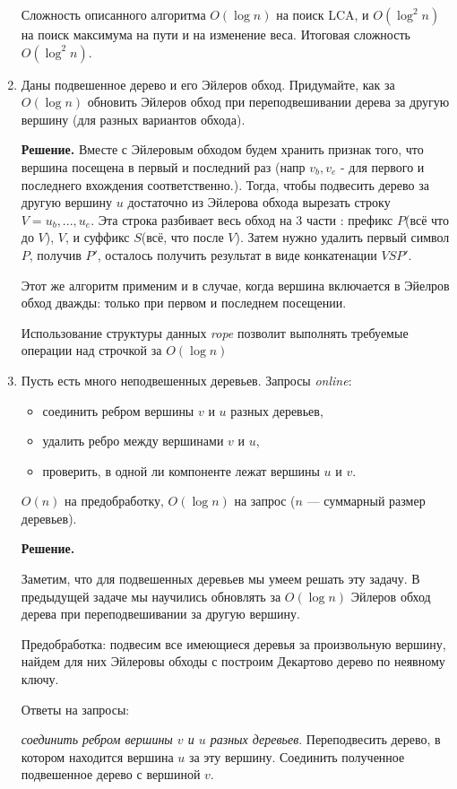 \begin{enumerate}
	Сложность описанного алгоритма $O(\log n)$ на поиск LCA, и $O(\log^2 
	n)$ на поиск максимума на пути и на изменение веса. Итоговая сложность 
	$O(\log^2 n)$.
	\item Даны подвешенное дерево и его Эйлеров обход. Придумайте, как за $O(\log n)$ обновить 
	Эйлеров	обход при переподвешивании дерева за другую вершину (для разных вариантов обхода).
	
	\textbf{Решение.} Вместе с Эйлеровым обходом будем хранить признак того, что вершина 
	посещена в первый и последний раз (напр $v_b, v_e$ - для первого и последнего вхождения 
	соответственно.). Тогда, чтобы подвесить дерево за другую вершину $u$ достаточно из 
	Эйлерова обхода вырезать строку  $V = u_b,..., u_e$. Эта строка разбивает весь обход на 3 
	части : префикс $P$(всё что до $V$), $V$, и суффикс $S$(всё, что после $V$). Затем нужно 
	удалить первый символ $P$, получив $P'$, осталось получить результат в виде конкатенации 
	$VSP'$.
	
	Этот же алгоритм применим и в случае, когда вершина включается в Эйелров обход дважды: только при первом и последнем посещении.
	
	Использование структуры данных \textit{rope} позволит выполнять требуемые операции над строчкой за $O(\log n)$
	
	\item Пусть есть много неподвешенных деревьев. Запросы \textit{online}:
	\begin{itemize}
		\item соединить ребром вершины $v$ и $u$ разных деревьев,
		\item удалить ребро между вершинами $v$ и $u$,
		\item проверить, в одной ли компоненте лежат вершины $u$ и $v$.
	\end{itemize}
	
	$O(n)$ на предобработку, $O(\log n)$ на запрос ($n$ — суммарный размер деревьев).
	
	\textbf{Решение.} 
	
	Заметим, что для подвешенных деревьев мы умеем решать эту задачу. В предыдущей задаче мы 
	научились обновлять за $O(\log n)$ Эйлеров обход дерева при переподвешивании за другую 
	вершину.
	
	Предобработка: подвесим все имеющиеся деревья за произвольную вершину, найдем для них 
	Эйлеровы обходы  с построим Декартово дерево по неявному ключу. 
	
	Ответы на запросы:
	
	\textit{соединить ребром вершины $v$ и $u$ разных деревьев}. Переподвесить дерево, в 
	котором находится вершина $u$ за эту вершину. Соединить полученное подвешенное дерево с 
	вершиной $v$.
	

\end{enumerate}
